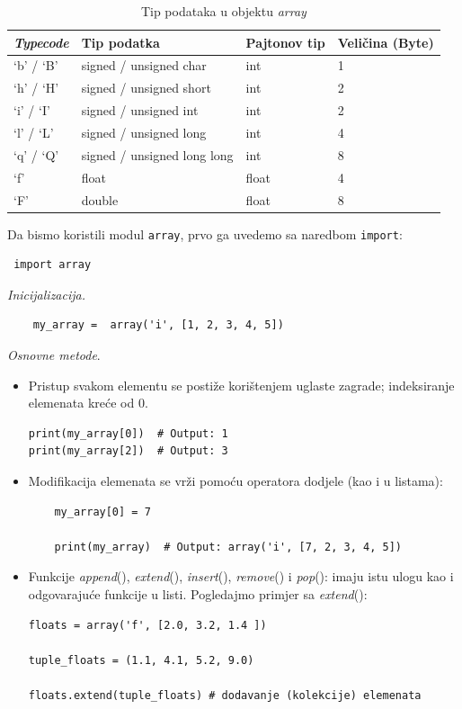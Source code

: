 \begin{table}[!ht]
	\caption{ Tip podataka u objektu \textit{array}}\label{tab: Tip podataka u objektu array}
	\centering
	\begin{tabular}{llll}  \hline \hline
		\emph{Typecode}      & Tip podatka                  & Pajtonov tip & Veličina (Byte) \\ \hline \hline
		`b' / `B' & signed / unsigned char    & int   & 1 \\
		
		`h' / `H'  & signed / unsigned  short  & int   & 2 \\
        `i' / `I'  & signed / unsigned int     & int   & 2 \\
        `l' / `L'  &  signed / unsigned long   & int   & 4 \\
        `q' / `Q'  & signed / unsigned long long & int & 8 \\
        `f'        & float                       & float & 4 \\
         `F'       & double                      & float & 8 \\ \hline \hline
		
	\end{tabular} 

\end{table}

Da bismo koristili modul \texttt{array}, prvo ga uvedemo sa naredbom \texttt{import}: 
\begin{verbatim}
 import array 
\end{verbatim}

\textit{Inicijalizacija. } 
\begin{verbatim}
    my_array =  array('i', [1, 2, 3, 4, 5])
\end{verbatim}

\textit{Osnovne metode}. 
\begin{itemize}
	\item Pristup svakom elementu se postiže korištenjem uglaste zagrade; indeksiranje elemenata kreće od 0. 
	\begin{verbatim}
print(my_array[0])  # Output: 1
print(my_array[2])  # Output: 3
	\end{verbatim}

\item Modifikacija elemenata se vrži pomoću operatora dodjele (kao i u listama):
\begin{verbatim}
	my_array[0] = 7
	
	print(my_array)  # Output: array('i', [7, 2, 3, 4, 5])
\end{verbatim}
\item Funkcije \textit{append}(), \textit{extend}(),  \textit{insert}(), \textit{remove}() i \textit{pop}():  imaju istu ulogu kao i odgovarajuće funkcije u listi. Pogledajmo primjer sa \textit{extend}(): 
\begin{verbatim}
floats = array('f', [2.0, 3.2, 1.4 ])

tuple_floats = (1.1, 4.1, 5.2, 9.0)

floats.extend(tuple_floats) # dodavanje (kolekcije) elemenata
\end{verbatim} 
  
\end{itemize}

